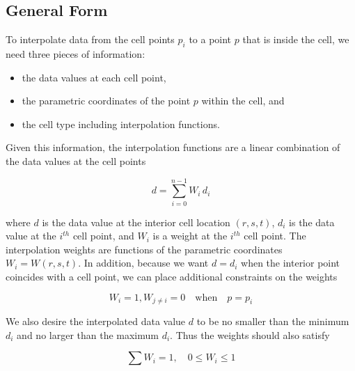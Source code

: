 \subsection{General Form}

To interpolate data from the cell points $p_i$ to a point $p$ that is inside the cell, we need three pieces of information:

\begin{itemize}

    \item the data values at each cell point,

    \item the parametric coordinates of the point $p$ within the cell, and

    \item the cell type including interpolation functions.

\end{itemize}

Given this information, the interpolation functions are a linear combination of the data values at the cell points

\begin{equation}\label{eq:8.4}
d = \sum_{i = 0}^{n - 1}W_i\,  d_i
\end{equation}

where $d$ is the data value at the interior cell location $(r,s,t)$, $d_i$ is the data value at the $i^{th}$ cell point, and $W_i$ is a weight at the $i^{th}$ cell point. The interpolation weights are functions of the parametric coordinates $W_i = W(r,s,t)$. In addition, because we want $d = d_i$ when the interior point coincides with a cell point, we can place additional constraints on the weights

\begin{equation}\label{eq:8.5}
W_i = 1, W_{j \neq i} = 0 \quad \text{when} \quad p = p_i
\end{equation}

We also desire the interpolated data value $d$ to be no smaller than the minimum $d_i$ and no larger than the maximum $d_i$. Thus the weights should also satisfy

\begin{equation}\label{eq:8.6}
\sum W_i = 1, \quad 0 \leq W_i \leq 1
\end{equation}

